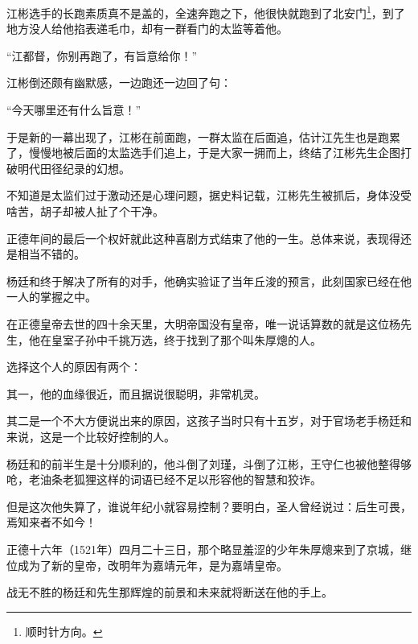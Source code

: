 \begin{multicols}{\theparacolNo}
		江彬选手的长跑素质真不是盖的，全速奔跑之下，他很快就跑到了北安门\footnote{顺时针方向。}，到了地方没人给他掐表递毛巾，却有一群看门的太监等着他。

		“江都督，你别再跑了，有旨意给你！”

		江彬倒还颇有幽默感，一边跑还一边回了句：

		“今天哪里还有什么旨意！”

		于是新的一幕出现了，江彬在前面跑，一群太监在后面追，估计江先生也是跑累了，慢慢地被后面的太监选手们追上，于是大家一拥而上，终结了江彬先生企图打破明代田径纪录的幻想。

		不知道是太监们过于激动还是心理问题，据史料记载，江彬先生被抓后，身体没受啥苦，胡子却被人扯了个干净。

		正德年间的最后一个权奸就此这种喜剧方式结束了他的一生。总体来说，表现得还是相当不错的。

		杨廷和终于解决了所有的对手，他确实验证了当年丘浚的预言，此刻国家已经在他一人的掌握之中。

		在正德皇帝去世的四十余天里，大明帝国没有皇帝，唯一说话算数的就是这位杨先生，他在皇室子孙中千挑万选，终于找到了那个叫朱厚熜的人。

		选择这个人的原因有两个：

		其一，他的血缘很近，而且据说很聪明，非常机灵。

		其二是一个不大方便说出来的原因，这孩子当时只有十五岁，对于官场老手杨廷和来说，这是一个比较好控制的人。

		杨廷和的前半生是十分顺利的，他斗倒了刘瑾，斗倒了江彬，王守仁也被他整得够呛，老油条老狐狸这样的词语已经不足以形容他的智慧和狡诈。

		但是这次他失算了，谁说年纪小就容易控制？要明白，圣人曾经说过：后生可畏，焉知来者不如今！

		正德十六年（1521年）四月二十三日，那个略显羞涩的少年朱厚熜来到了京城，继位成为了新的皇帝，改明年为嘉靖元年，是为嘉靖皇帝。

		战无不胜的杨廷和先生那辉煌的前景和未来就将断送在他的手上。
		\ifnum{}
	\end{multicols}
\fi
